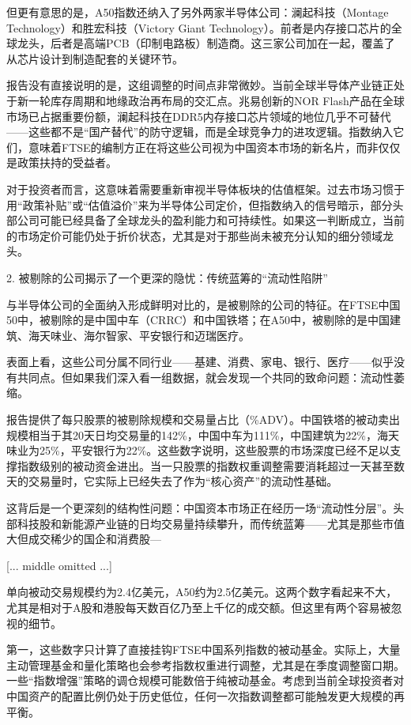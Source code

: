 \documentclass[11pt]{ctexart}
\begin{document}
但更有意思的是，A50指数还纳入了另外两家半导体公司：澜起科技（Montage Technology）和胜宏科技（Victory Giant Technology）。前者是内存接口芯片的全球龙头，后者是高端PCB（印制电路板）制造商。这三家公司加在一起，覆盖了从芯片设计到制造配套的关键环节。

报告没有直接说明的是，这组调整的时间点非常微妙。当前全球半导体产业链正处于新一轮库存周期和地缘政治再布局的交汇点。兆易创新的NOR Flash产品在全球市场已占据重要份额，澜起科技在DDR5内存接口芯片领域的地位几乎不可替代——这些都不是“国产替代”的防守逻辑，而是全球竞争力的进攻逻辑。指数纳入它们，意味着FTSE的编制方正在将这些公司视为中国资本市场的新名片，而非仅仅是政策扶持的受益者。

对于投资者而言，这意味着需要重新审视半导体板块的估值框架。过去市场习惯于用“政策补贴”或“估值溢价”来为半导体公司定价，但指数纳入的信号暗示，部分头部公司可能已经具备了全球龙头的盈利能力和可持续性。如果这一判断成立，当前的市场定价可能仍处于折价状态，尤其是对于那些尚未被充分认知的细分领域龙头。

2. 被剔除的公司揭示了一个更深的隐忧：传统蓝筹的“流动性陷阱”

与半导体公司的全面纳入形成鲜明对比的，是被剔除的公司的特征。在FTSE中国50中，被剔除的是中国中车（CRRC）和中国铁塔；在A50中，被剔除的是中国建筑、海天味业、海尔智家、平安银行和迈瑞医疗。

表面上看，这些公司分属不同行业——基建、消费、家电、银行、医疗——似乎没有共同点。但如果我们深入看一组数据，就会发现一个共同的致命问题：流动性萎缩。

报告提供了每只股票的被剔除规模和交易量占比（\%ADV）。中国铁塔的被动卖出规模相当于其20天日均交易量的142\%，中国中车为111\%，中国建筑为22\%，海天味业为25\%，平安银行为22\%。这些数字说明，这些股票的市场深度已经不足以支撑指数级别的被动资金进出。当一只股票的指数权重调整需要消耗超过一天甚至数天的交易量时，它实际上已经失去了作为“核心资产”的流动性基础。

这背后是一个更深刻的结构性问题：中国资本市场正在经历一场“流动性分层”。头部科技股和新能源产业链的日均交易量持续攀升，而传统蓝筹——尤其是那些市值大但成交稀少的国企和消费股—

[... middle omitted ...]

单向被动交易规模约为2.4亿美元，A50约为2.5亿美元。这两个数字看起来不大，尤其是相对于A股和港股每天数百亿乃至上千亿的成交额。但这里有两个容易被忽视的细节。

第一，这些数字只计算了直接挂钩FTSE中国系列指数的被动基金。实际上，大量主动管理基金和量化策略也会参考指数权重进行调整，尤其是在季度调整窗口期。一些“指数增强”策略的调仓规模可能数倍于纯被动基金。考虑到当前全球投资者对中国资产的配置比例仍处于历史低位，任何一次指数调整都可能触发更大规模的再平衡。
\end{document}
